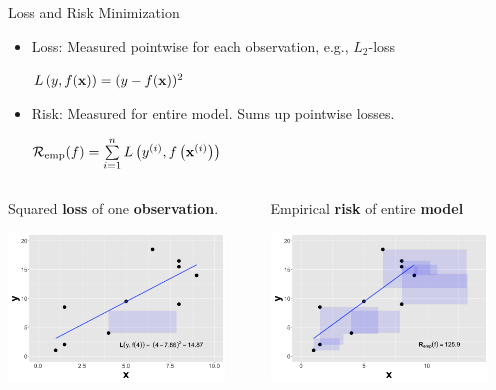 \documentclass[11pt,compress,t,notes=noshow, xcolor=table]{beamer}
\begin{document}
\begin{vbframe}{Loss and Risk Minimization}

\begin{itemize}
\item Loss: Measured pointwise for each observation, e.g., $L_2$-loss 
\begin{center}
$L\left(y, f(\mathbf{x})\right) = (y - f(\mathbf{x}))^2$
\end{center}
\item Risk: Measured for entire model. Sums up pointwise losses.
\begin{center}
$ \mathcal{R}_{\text{emp}}(f) = \sum\limits_{i=1}^n L\left(y^{(i)}, f\left(\mathbf{x}^{(i)}\right)\right) $
\end{center} 
\hspace{1cm}
\end{itemize}
\begin{columns}  
\begin{column}{0.5\textwidth} 
\small Squared \textbf{loss} of one \textbf{observation}.
  \begin{center}
    \includegraphics[width=0.9\textwidth]{slides/ml-basics/figure/nutshell-ml-basics-loss-regression.png} 
  \end{center}
\end{column}  
\begin{column}{0.5\textwidth} 
\small Empirical \textbf{risk} of entire \textbf{model}

  \begin{center}
    \includegraphics[width=0.9\textwidth]{slides/ml-basics/figure/nutshell-ml-basics-empirical-risk-regression.png} 
  \end{center}
\end{column} 
\end{columns}
\end{vbframe}
\end{document}

